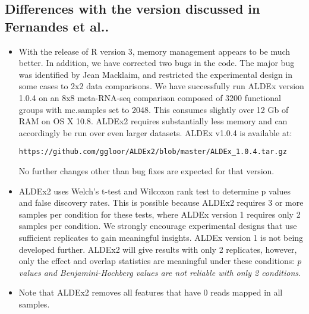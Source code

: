 \documentclass[11pt]{amsart}
\begin{document}
\subsection{Differences with the version discussed in Fernandes et al..\cite{fernandes:2013}}  
\begin{itemize}

\item With the release of R version 3, memory management appears to be much better. In addition, we have corrected two bugs in the code. The major bug was identified by Jean Macklaim, and restricted the experimental design in some cases to 2x2 data comparisons. We have successfully run ALDEx version 1.0.4 on an 8x8 meta-RNA-seq comparison composed of 3200 functional groups with mc.samples set to 2048. This consumes slightly over 12 Gb of RAM on OS X 10.8. ALDEx2  requires substantially less memory and can accordingly be run over even larger datasets. ALDEx v1.0.4 is available at: \begin{verbatim}https://github.com/ggloor/ALDEx2/blob/master/ALDEx_1.0.4.tar.gz\end{verbatim} No further changes other than bug fixes are expected for that version. 

\item ALDEx2 uses Welch's t-test and Wilcoxon rank test to determine p values and false discovery rates. This is possible because ALDEx2 requires 3 or more samples per condition for these tests, where ALDEx version 1 requires only 2 samples per condition. We strongly encourage experimental designs that use sufficient replicates to gain meaningful insights. ALDEx version 1 is not being developed further. ALDEx2 will give results with only 2 replicates, however, only the effect and overlap statistics are meaningful under these conditions: \emph{p values and Benjamini-Hochberg values are not reliable with only 2 conditions}.

\item Note that ALDEx2 removes all features that have 0 reads mapped in all samples.
\end{itemize}
\end{document}
